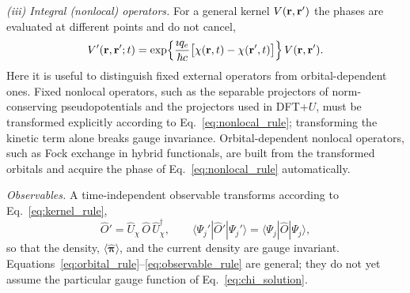 \emph{(iii) Integral (nonlocal) operators.} For a general kernel
$V(\vb{r},\vb{r}')$ the phases are evaluated at different points and do not
cancel,
\begin{equation}
  V'(\vb{r},\vb{r}';t)
  = \exp\!\left\{\frac{\imath q_e}{\hbar c}\big[\chi(\vb{r},t)-\chi(\vb{r}',t)\big]\right\}
    V(\vb{r},\vb{r}') .
  \label{eq:nonlocal_rule}
\end{equation}
Here it is useful to distinguish fixed external operators from
orbital-dependent ones. Fixed nonlocal operators, such as the separable projectors of
norm-conserving pseudopotentials and the projectors used in DFT+$U$, must be
transformed explicitly according to Eq.~\eqref{eq:nonlocal_rule}; transforming
the kinetic term alone breaks gauge
invariance.\cite{IsmailBeigi-2001-EM,pickard-mauri-2001,Mattiat-Luber-2022}
Orbital-dependent nonlocal operators, such as Fock exchange in hybrid
functionals, are built from the transformed orbitals and acquire the phase of
Eq.~\eqref{eq:nonlocal_rule} automatically.

\emph{Observables.} A time-independent observable transforms according to
Eq.~\eqref{eq:kernel_rule},
\begin{equation}
  \hat O' = \hat U_\chi\,\hat O\,\hat U_\chi^\dagger,
  \qquad
  \langle\Psi_j'|\hat O'|\Psi_j'\rangle = \langle\Psi_j|\hat O|\Psi_j\rangle ,
  \label{eq:observable_rule}
\end{equation}
so that the density, $\langle\hat{\boldsymbol{\pi}}\rangle$, and the current
density are gauge invariant. Equations~\eqref{eq:orbital_rule}--\eqref{eq:observable_rule}
are general; they do not yet assume the particular gauge function of
Eq.~\eqref{eq:chi_solution}.

